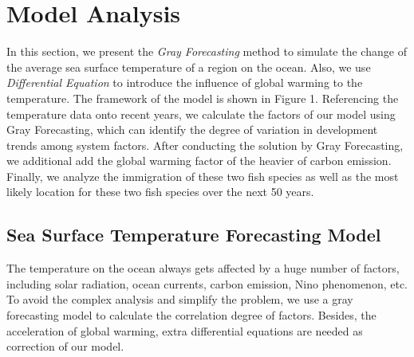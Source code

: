 \documentclass{mcmthesis}
\begin{document}
\section{Model Analysis} \label{S4}
		In this section, we present the \emph{Gray Forecasting} method to simulate the change of the average sea surface temperature of a region on the ocean. Also, we use \emph{Differential Equation} to introduce the influence of global warming to the temperature. The framework of the model is shown in Figure 1. Referencing the temperature data onto recent years, we calculate the factors of our model using Gray Forecasting, which can identify the degree of variation in development trends among system factors. After conducting the solution by Gray Forecasting, we additional add the global warming factor of the heavier of carbon emission. Finally, we analyze the immigration of these two fish species as well as the most likely location for these two fish species over the next 50 years.

\subsection{Sea Surface Temperature Forecasting Model}\label{S4s1}
	The temperature on the ocean always gets affected by a huge number of factors, including solar radiation, ocean currents, carbon emission, Nino phenomenon, etc. To avoid the complex analysis and simplify the problem, we use a gray forecasting model to calculate the correlation degree of factors. Besides, the acceleration of global warming, extra differential equations are needed as correction of our model.
\end{document}
